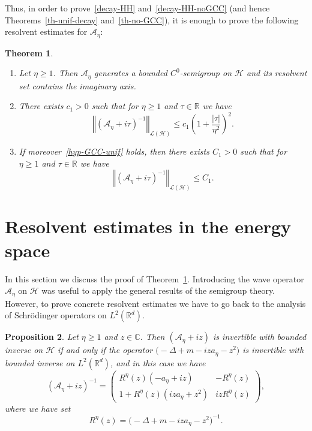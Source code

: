 \documentclass[11pt]{article}
\newtheorem{theo}{Theorem}[section]
\newtheorem{prop}[theo]{Proposition}
\theoremstyle{definition}
\newcommand{\pointir}{.\ ---\ }
\numberwithin{equation}{section}
\numberwithin{figure}{section}
\numberwithin{table}{section}
\newcommand{\abs}[1]{\left\vert #1\right\vert}
\newcommand{\nr}[1]{\left\Vert #1\right\Vert}
\renewcommand{\leq}{\leqslant}
\renewcommand{\geq}{\geqslant}
\newcommand{\inv}{^{-1}}
\newcommand{\1}{\mathds 1}
\newcommand{\R}{\mathbb{R}}
\newcommand{\D}{\Delta}
\renewcommand{\t}{\tau}
\newcommand{\Ac}{{\mathcal A}}
\newcommand{\Hc}{{\mathcal H}}
\newcommand{\Lc}{{\mathcal L}}
\newcommand{\HH}{\mathcal H}
\begin{document}
Thus, in order to prove~\eqref{decay-HH} and~\eqref{decay-HH-noGCC} (and hence Theorems~\ref{th-unif-decay} and~\ref{th-no-GCC}), it is enough to prove the following resolvent estimates for $\Ac_\eta$:

\let\oldpointir\pointir
\renewcommand{\pointir}{}
\begin{theo}\label{th-res-Ac}\ 
\begin{enumerate}%
\item Let $\eta \geq 1$. Then $\Ac_\eta$ generates a bounded $C^0$-semigroup on $\HH$ and its resolvent set contains the imaginary axis.
\item There exists $c_1 > 0$ such that for $\eta \geq 1$ and $\t \in \R$ we have
\[
\nr{(\Ac_\eta + i\tau)\inv}_{\Lc(\HH)} \leq c_1 \left(1+\frac {\abs{\t}}{\eta^2} \right)^2.
\]
\item If moreover~\eqref{hyp-GCC-unif} holds, then there exists $C_1 > 0$ such that for $\eta \geq 1$ and $\t \in \R$ we have
\[
\nr{(\Ac_\eta + i\tau)\inv}_{\Lc(\HH)} \leq C_1.
\]
\end{enumerate}
\end{theo}
\let\pointir\oldpointir

\section{Resolvent estimates in the energy space} \label{sec-res-from-L2-to-Hc}

In this section we discuss the proof of Theorem~\ref{th-res-Ac}. Introducing the wave operator $\Ac_\eta$ on $\HH$ was useful to apply the general results of the semigroup theory. However, to prove concrete resolvent estimates we have to go back to the analysis of Schr\"odinger operators on $L^2(\R^d)$.

\begin{prop}\label{prop-res-Ac-Rz}
Let $\eta \geq 1$ and $z \in \mathbb C$. Then $(\Ac_\eta +iz)$ is invertible with bounded inverse on $\Hc$ if and only if the operator $ {\big(-\D + m -iza_\eta -z^2\big)} $ is invertible with bounded inverse on $L^2(\R^d)$, and in this case we have
\begin{equation}\label{expr-res-Ac}
(\Ac_\eta +iz)\inv =
\begin{pmatrix}
R^\eta(z) (-a_\eta + iz) & -R^\eta(z) \\
1 + R^\eta(z) (iz a_\eta+z^2) & i z R^\eta(z)
\end{pmatrix},
\end{equation}
where we have set
\[
R^\eta(z) = \big(-\D + m -iza_\eta -z^2\big)\inv.
\]
\end{prop}
\end{document}
